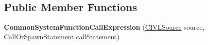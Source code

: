 \subsection*{Public Member Functions}
\begin{DoxyCompactItemize}
\item 
\hypertarget{classedu_1_1udel_1_1cis_1_1vsl_1_1civl_1_1model_1_1common_1_1expression_1_1CommonSystemFunctionCallExpression_a36abc828dab8a606e45b96610e3711d1}{}{\bfseries Common\+System\+Function\+Call\+Expression} (\hyperlink{interfaceedu_1_1udel_1_1cis_1_1vsl_1_1civl_1_1model_1_1IF_1_1CIVLSource}{C\+I\+V\+L\+Source} source, \hyperlink{interfaceedu_1_1udel_1_1cis_1_1vsl_1_1civl_1_1model_1_1IF_1_1statement_1_1CallOrSpawnStatement}{Call\+Or\+Spawn\+Statement} call\+Statement)\label{classedu_1_1udel_1_1cis_1_1vsl_1_1civl_1_1model_1_1common_1_1expression_1_1CommonSystemFunctionCallExpression_a36abc828dab8a606e45b96610e3711d1}


\end{DoxyCompactItemize}
